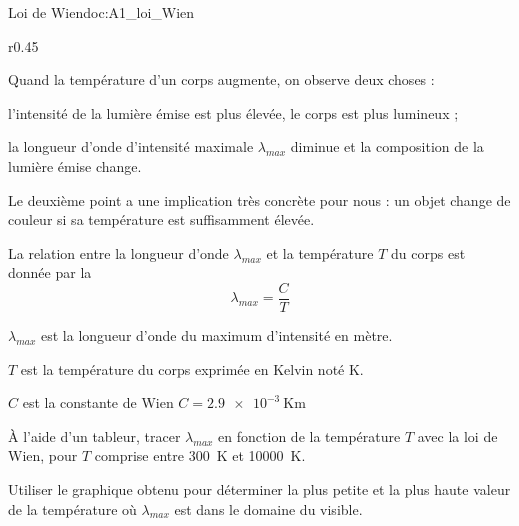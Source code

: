\begin{doc}{Loi de Wien}{doc:A1_loi_Wien}
  \begin{wrapfigure}[10]{r}{0.45\linewidth}
    \vspace*{-28pt}
    \centering
  \end{wrapfigure}
  
  Quand la température d'un corps augmente, on observe deux choses :
  \begin{listeTirets}
    \item l'intensité de la lumière émise est plus élevée, le corps est plus lumineux ;
    \item la longueur d'onde d'intensité maximale $\lambda_{max}$ diminue et la composition de la lumière émise change.
  \end{listeTirets}
  Le deuxième point a une implication très concrète pour nous : un objet change de couleur si sa température est suffisamment élevée.
  \smallskip

  \begin{importants}
    La relation entre la longueur d'onde $\lambda_{max}$ et la température $T$ du corps est donnée par la 
    \begin{equation*}
      \lambda_{max} = \dfrac{C}{T}
    \end{equation*}
    \begin{listePoints}
      \item $\lambda_{max}$ est la longueur d'onde du maximum d'intensité en mètre.
      \item $T$ est la température du corps exprimée en Kelvin noté \unit{\kelvin}.
      \item $C$ est la constante de Wien $C = \qty{2,9e-3}{\kelvin\m}$
    \end{listePoints}
  \end{importants}
\end{doc}


\mesure
À l'aide d'un tableur, tracer $\lambda_{max}$ en fonction de la température $T$ avec la loi de Wien, pour $T$ comprise entre \qty{300}{\kelvin} et \qty{10000}{\kelvin}.

\mesure
Utiliser le graphique obtenu pour déterminer la plus petite et la plus haute valeur de la température où $\lambda_{max}$ est dans le domaine du visible.

